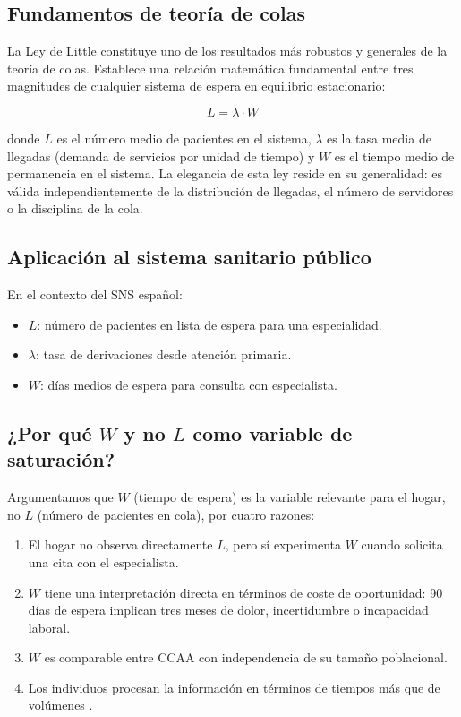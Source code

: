 \subsection{Fundamentos de teoría de colas}

La Ley de Little \parencite{Little1961} constituye uno de los resultados más
robustos y generales de la teoría de colas. Establece una relación matemática
fundamental entre tres magnitudes de cualquier sistema de espera en equilibrio
estacionario:

\begin{equation}
  L = \lambda \cdot W
  \label{eq:little}
\end{equation}

donde $L$ es el número medio de pacientes en el sistema, $\lambda$ es la tasa
media de llegadas (demanda de servicios por unidad de tiempo) y $W$ es el tiempo
medio de permanencia en el sistema. La elegancia de esta ley reside en su
generalidad: es válida independientemente de la distribución de llegadas, el
número de servidores o la disciplina de la cola.

\subsection{Aplicación al sistema sanitario público}

En el contexto del SNS español:

\begin{itemize}
  \item $L$: número de pacientes en lista de espera para una especialidad.
  \item $\lambda$: tasa de derivaciones desde atención primaria.
  \item $W$: días medios de espera para consulta con especialista.
\end{itemize}

\subsection{\texorpdfstring{¿Por qué \(W\) y no \(L\) como variable de saturación?}{Por que W y no L como variable de saturacion}}

Argumentamos que $W$ (tiempo de espera) es la variable relevante para el hogar,
no $L$ (número de pacientes en cola), por cuatro razones:

\begin{enumerate}
  \item El hogar no observa directamente $L$, pero sí experimenta $W$ cuando
    solicita una cita con el especialista.
  \item $W$ tiene una interpretación directa en términos de coste de oportunidad:
    90 días de espera implican tres meses de dolor, incertidumbre o incapacidad
    laboral.
  \item $W$ es comparable entre CCAA con independencia de su tamaño poblacional.
  \item Los individuos procesan la información en términos de tiempos más que de
    volúmenes \parencite{Kahneman1979}.
\end{enumerate}

